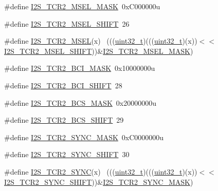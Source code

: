 \begin{DoxyCompactItemize}
\item 
\#define \hyperlink{group___i2_s___register___masks_ga69d35574d74902b5a5dac263afe83957}{I2\+S\+\_\+\+T\+C\+R2\+\_\+\+M\+S\+E\+L\+\_\+\+M\+A\+SK}~0x\+C000000u
\item 
\#define \hyperlink{group___i2_s___register___masks_ga3f2208b190e1f9a951d300e726f6df76}{I2\+S\+\_\+\+T\+C\+R2\+\_\+\+M\+S\+E\+L\+\_\+\+S\+H\+I\+FT}~26
\item 
\#define \hyperlink{group___i2_s___register___masks_gac012ee5d2d891d34e59c65d965be67a7}{I2\+S\+\_\+\+T\+C\+R2\+\_\+\+M\+S\+EL}(x)                                              ~(((\hyperlink{_p_e___types_8h_a33594304e786b158f3fb30289278f5af}{uint32\+\_\+t})(((\hyperlink{_p_e___types_8h_a33594304e786b158f3fb30289278f5af}{uint32\+\_\+t})(x))$<$$<$\hyperlink{group___i2_s___register___masks_ga3f2208b190e1f9a951d300e726f6df76}{I2\+S\+\_\+\+T\+C\+R2\+\_\+\+M\+S\+E\+L\+\_\+\+S\+H\+I\+FT}))\&\hyperlink{group___i2_s___register___masks_ga69d35574d74902b5a5dac263afe83957}{I2\+S\+\_\+\+T\+C\+R2\+\_\+\+M\+S\+E\+L\+\_\+\+M\+A\+SK})
\item 
\#define \hyperlink{group___i2_s___register___masks_ga1e16e8f58e2213ea6ea8fbe96f6b0b09}{I2\+S\+\_\+\+T\+C\+R2\+\_\+\+B\+C\+I\+\_\+\+M\+A\+SK}~0x10000000u
\item 
\#define \hyperlink{group___i2_s___register___masks_gaa9612abbad00a02a4d3dc1a7dfe6463d}{I2\+S\+\_\+\+T\+C\+R2\+\_\+\+B\+C\+I\+\_\+\+S\+H\+I\+FT}~28
\item 
\#define \hyperlink{group___i2_s___register___masks_ga8969a374d290181e8f2c7a1c5ff4f31b}{I2\+S\+\_\+\+T\+C\+R2\+\_\+\+B\+C\+S\+\_\+\+M\+A\+SK}~0x20000000u
\item 
\#define \hyperlink{group___i2_s___register___masks_ga4f9b5cf67219ec5115ced3b69bfda155}{I2\+S\+\_\+\+T\+C\+R2\+\_\+\+B\+C\+S\+\_\+\+S\+H\+I\+FT}~29
\item 
\#define \hyperlink{group___i2_s___register___masks_ga2626d37b42ede711d867e8f750fb2c2c}{I2\+S\+\_\+\+T\+C\+R2\+\_\+\+S\+Y\+N\+C\+\_\+\+M\+A\+SK}~0x\+C0000000u
\item 
\#define \hyperlink{group___i2_s___register___masks_ga7817b4e017fd01d7ca9a59e87008656f}{I2\+S\+\_\+\+T\+C\+R2\+\_\+\+S\+Y\+N\+C\+\_\+\+S\+H\+I\+FT}~30
\item 
\#define \hyperlink{group___i2_s___register___masks_ga09f26fa241803f9f821314538bfa520b}{I2\+S\+\_\+\+T\+C\+R2\+\_\+\+S\+Y\+NC}(x)                                              ~(((\hyperlink{_p_e___types_8h_a33594304e786b158f3fb30289278f5af}{uint32\+\_\+t})(((\hyperlink{_p_e___types_8h_a33594304e786b158f3fb30289278f5af}{uint32\+\_\+t})(x))$<$$<$\hyperlink{group___i2_s___register___masks_ga7817b4e017fd01d7ca9a59e87008656f}{I2\+S\+\_\+\+T\+C\+R2\+\_\+\+S\+Y\+N\+C\+\_\+\+S\+H\+I\+FT}))\&\hyperlink{group___i2_s___register___masks_ga2626d37b42ede711d867e8f750fb2c2c}{I2\+S\+\_\+\+T\+C\+R2\+\_\+\+S\+Y\+N\+C\+\_\+\+M\+A\+SK})

\end{DoxyCompactItemize}
